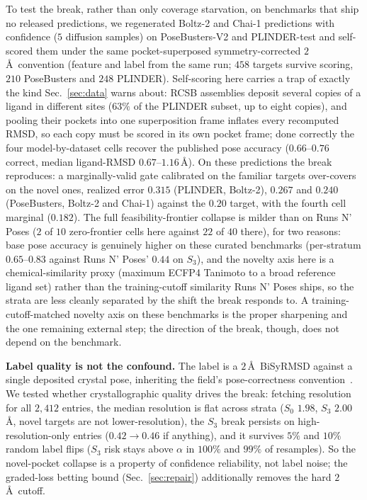 \documentclass[10pt]{article}
\begin{document}
To test the break, rather than only coverage starvation, on benchmarks that ship no released
predictions, we regenerated Boltz-2 and Chai-1 predictions with confidence ($5$ diffusion samples) on
PoseBusters-V2 and PLINDER-test and self-scored them under the same pocket-superposed symmetry-corrected
$2$\,\AA\ convention (feature and label from the same run; $458$ targets survive scoring, $210$
PoseBusters and $248$ PLINDER). Self-scoring here carries a trap of exactly the kind Sec.~\ref{sec:data}
warns about: RCSB assemblies deposit several copies of a ligand in different sites ($63\%$ of the PLINDER
subset, up to eight copies), and pooling their pockets into one superposition frame inflates every
recomputed RMSD, so each copy must be scored in its own pocket frame; done correctly the four
model-by-dataset cells recover the published pose accuracy ($0.66$--$0.76$ correct, median ligand-RMSD
$0.67$--$1.16$\,\AA). On these predictions the break reproduces: a marginally-valid gate calibrated on the
familiar targets over-covers on the novel ones, realized error $0.315$ (PLINDER, Boltz-2), $0.267$ and
$0.240$ (PoseBusters, Boltz-2 and Chai-1) against the $0.20$ target, with the fourth cell marginal
($0.182$). The full feasibility-frontier collapse is milder than on Runs N' Poses ($2$ of $10$
zero-frontier cells here against $22$ of $40$ there), for two reasons: base
pose accuracy is genuinely higher on these curated benchmarks (per-stratum $0.65$--$0.83$ against Runs N'
Poses' $0.44$ on $S_3$), and the novelty axis here is a chemical-similarity proxy (maximum ECFP4 Tanimoto
to a broad reference ligand set) rather than the training-cutoff similarity Runs N' Poses ships, so the
strata are less cleanly separated by the shift the break responds to. A training-cutoff-matched novelty
axis on these benchmarks is the proper sharpening and the one remaining external step; the direction of the
break, though, does not depend on the benchmark.

\textbf{Label quality is not the confound.} The label is a $2$\,\AA\ BiSyRMSD against a single deposited
crystal pose, inheriting the field's pose-correctness convention~\citep{posebusters}. We tested whether
crystallographic quality drives the break: fetching resolution for all $2{,}412$ entries, the median
resolution is flat across strata ($S_0$ $1.98$, $S_3$ $2.00$\,\AA, novel targets are not lower-resolution),
the $S_3$ break persists on high-resolution-only entries ($0.42\to0.46$ if anything), and it survives $5\%$
and $10\%$ random label flips ($S_3$ risk stays above $\alpha$ in $100\%$ and $99\%$ of resamples). So the
novel-pocket collapse is a property of confidence reliability, not label noise; the graded-loss betting
bound (Sec.~\ref{sec:repair}) additionally removes the hard $2$\,\AA\ cutoff.
\end{document}
